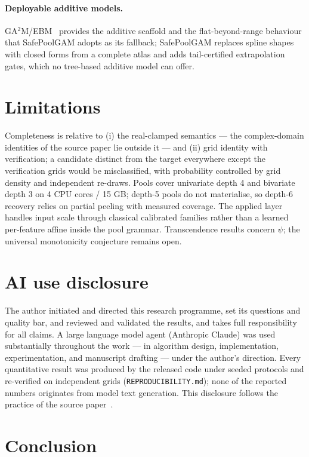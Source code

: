 \documentclass[11pt]{article}
\begin{document}
\paragraph{Deployable additive models.} GA$^2$M/EBM~\cite{lou2013accurate}
provides the additive scaffold and the flat-beyond-range behaviour
that SafePoolGAM adopts as its fallback; SafePoolGAM replaces spline
shapes with closed forms from a complete atlas and adds
tail-certified extrapolation gates, which no tree-based additive
model can offer.

\section{Limitations}

Completeness is relative to (i) the real-clamped semantics — the
complex-domain identities of the source paper lie outside it — and
(ii) grid identity with verification; a candidate distinct from the
target everywhere except the verification grids would be
misclassified, with probability controlled by grid density and
independent re-draws. Pools cover univariate depth 4 and bivariate
depth 3 on 4 CPU cores / 15 GB; depth-5 pools do not materialise, so
depth-6 recovery relies on partial peeling with measured coverage.
The applied layer handles input scale through classical calibrated
families rather than a learned per-feature affine inside the pool
grammar. Transcendence results concern $\psi$; the universal
monotonicity conjecture remains open.

\section*{AI use disclosure}

The author initiated and directed this research programme, set its
questions and quality bar, and reviewed and validated the results,
and takes full responsibility for all claims. A large language model
agent (Anthropic Claude) was used substantially throughout the work
— in algorithm design, implementation, experimentation, and
manuscript drafting — under the author's direction. Every
quantitative result was produced by the released code under seeded
protocols and re-verified on independent grids
(\texttt{REPRODUCIBILITY.md}); none of the reported numbers
originates from model text generation. This disclosure follows the
practice of the source paper~\cite{odrzywolek2026eml}.

\section{Conclusion}
\end{document}
